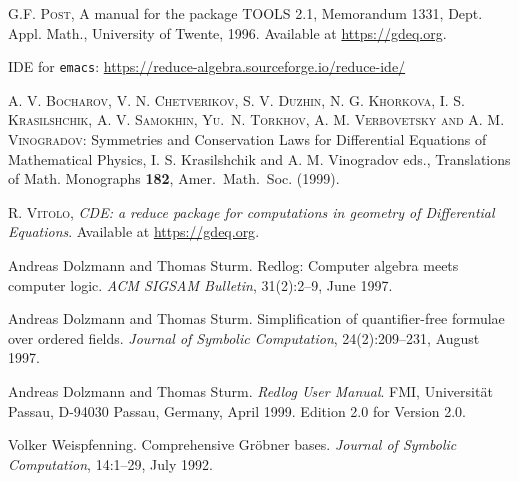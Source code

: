 \begin{thebibliography}{999}
 \textsc{G.F. Post}, A manual for the package TOOLS 2.1,
    Memorandum 1331, Dept. Appl. Math., University of Twente, 1996. Available
    at \url{https://gdeq.org}.

 \REDUCE IDE for \texttt{emacs}:
    \url{https://reduce-algebra.sourceforge.io/reduce-ide/}

 \textsc{A. V. Bocharov, V. N. Chetverikov, S. V.  Duzhin, N.
      G.  Khor{\cprime}kova, I. S.  Krasil{\cprime}shchik, A.  V.  Samokhin,
      Yu.\ N.  Torkhov, A. M. Verbovetsky and A. M.  Vinogradov}: Symmetries
    and Conservation Laws for Differential Equations of Mathematical Physics,
    I.  S.  Krasil{\cprime}shchik and A. M.  Vinogradov eds., Translations of
    Math.  Monographs \textbf{182}, Amer.\ Math.\ Soc. (1999).



 \textsc{R. Vitolo}, \emph{CDE: a reduce package for computations
  in geometry of Differential Equations}. Available at \url{https://gdeq.org}.



Andreas Dolzmann and Thomas Sturm.
\newblock Redlog: Computer algebra meets computer logic.
\newblock \emph{ACM SIGSAM Bulletin}, 31(2):2--9, June 1997.

Andreas Dolzmann and Thomas Sturm.
\newblock Simplification of quantifier-free formulae over ordered fields.
\newblock \emph{Journal of Symbolic Computation}, 24(2):209--231, August 1997.

Andreas Dolzmann and Thomas Sturm.
\newblock \emph{Redlog User Manual}.
\newblock FMI, Universit\"at Passau, D-94030 Passau, Germany, April 1999.
\newblock Edition 2.0 for Version 2.0.

Volker Weispfenning.
\newblock Comprehensive {G}r\"obner bases.
\newblock \emph{Journal of Symbolic Computation}, 14:1--29, July 1992.



\end{thebibliography}
